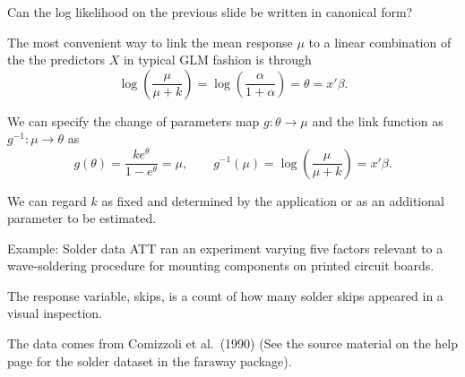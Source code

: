 \documentclass[
  ignorenonframetext,
]{beamer}
\begin{document}
\begin{frame}{}
\protect\hypertarget{section-29}{}
\begin{center}
Can the log likelihood on the previous slide be written in canonical form?
\end{center}
\end{frame}

\begin{frame}{}
\protect\hypertarget{section-30}{}
The most convenient way to link the mean response \(\mu\) to a linear
combination of the the predictors \(X\) in typical GLM fashion is
through \[
  \log\left(\frac{\mu}{\mu+k}\right) = \log\left(\frac{\alpha}{1+\alpha}\right) = \theta = x'\beta.
\]

\vspace{12pt}

We can specify the change of parameters map \(g:\theta\to\mu\) and the
link function as \(g^{-1}:\mu\to\theta\) as \[
  g(\theta) = \frac{ke^\theta}{1 - e^\theta} = \mu, \qquad 
    g^{-1}(\mu) = \log\left(\frac{\mu}{\mu+k}\right) = x'\beta.
\]

\vspace{12pt}

We can regard \(k\) as fixed and determined by the application or as an
additional parameter to be estimated.
\end{frame}

\begin{frame}{Example: Solder data}
\protect\hypertarget{example-solder-data}{}
ATT ran an experiment varying five factors relevant to a wave-soldering
procedure for mounting components on printed circuit boards.

\vspace{12pt}

The response variable, skips, is a count of how many solder skips
appeared in a visual inspection.

\vspace{12pt}

The data comes from Comizzoli et al.~(1990) (See the source material on
the help page for the solder dataset in the faraway package).
\end{frame}
\end{document}
